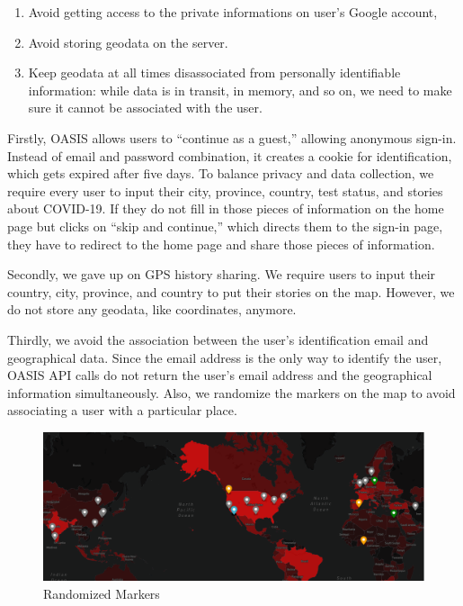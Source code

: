 \documentclass{ucsdreport}
\begin{document}
\begin{enumerate}
    \item Avoid getting access to the private informations on user’s Google account,
    \item Avoid storing geodata on the server.
    \item Keep geodata at all times disassociated from personally identifiable 
    information: while data is in transit, in memory, and so on, we need to make
    sure it cannot be associated with the user.
\end{enumerate}

Firstly, OASIS allows users to “continue as a guest,” allowing anonymous 
sign-in. Instead of email and password combination, it creates a cookie for 
identification, which gets expired after five days. To balance privacy and data
collection, we require every user to input their city, province, country, test
status, and stories about COVID-19. If they do
not fill in those pieces of information on the home page but clicks on “skip and
continue,” which directs them to the sign-in page, they have to redirect to the
home page and share those pieces of information.

 
Secondly, we gave up on GPS history sharing. We require users to input their 
country, city, province, and country to put their stories on the map. However,
we do not store any geodata, like coordinates, anymore. 

Thirdly, we avoid the association between the user’s identification email and 
geographical data. Since the email address is the only way to identify the 
user, OASIS API calls do not return the user’s email address and the
geographical information simultaneously. Also, we randomize the markers on the
map to avoid associating a user with a particular place.

\begin{figure}[H]
    \centering
    \includegraphics[scale=0.38]{images/markers.png}
    \caption{Randomized Markers}
\end{figure}
\end{document}
